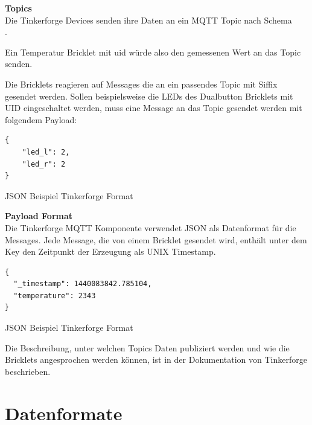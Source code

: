 \textbf{Topics} \\
Die Tinkerforge Devices senden ihre Daten an ein MQTT Topic nach Schema \\ .

Ein Temperatur Bricklet mit \acrfull{uid}  würde also den gemessenen Wert an das Topic \\
 senden.

Die Bricklets reagieren auf Messages die an ein passendes Topic mit Siffix  gesendet werden. Sollen beispielsweise die LEDs des Dualbutton Bricklets mit UID  eingeschaltet werden, muss eine Message an das Topic  gesendet werden mit folgendem Payload:

\begin{listing}[H]
\begin{verbatim}
{
    "led_l": 2,
    "led_r": 2
}
\end{verbatim}
\caption{JSON Beispiel Tinkerforge Format}
\end{listing}



\textbf{Payload Format} \\
Die Tinkerforge MQTT Komponente verwendet JSON als Datenformat für die Messages. Jede Message, die von einem Bricklet gesendet wird, enthält unter dem Key  den Zeitpunkt der Erzeugung als UNIX Timestamp.

\begin{listing}[H]
\begin{verbatim}
{
  "_timestamp": 1440083842.785104,
  "temperature": 2343
}
\end{verbatim}
\caption{JSON Beispiel Tinkerforge Format}
\end{listing}


Die Beschreibung, unter welchen Topics Daten publiziert werden und wie die Bricklets angesprochen werden können, ist in der Dokumentation von Tinkerforge \cite{tinkerf:mqtt} beschrieben.


\section{Datenformate}

